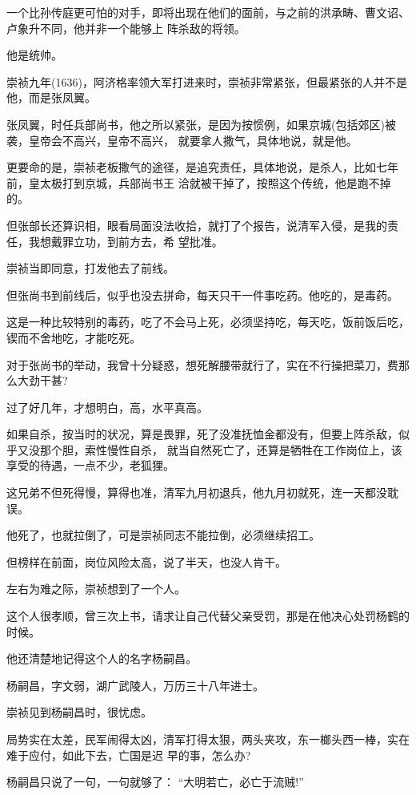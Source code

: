 \documentclass[11pt,a4paper,onecolumn]{article}
\begin{document}
一个比孙传庭更可怕的对手，即将出现在他们的面前，与之前的洪承畴、曹文诏、卢象升不同，他并非一个能够上
阵杀敌的将领。

他是统帅。

崇祯九年(1636)，阿济格率领大军打进来时，崇祯非常紧张，但最紧张的人并不是他，而是张凤翼。

张凤翼，时任兵部尚书，他之所以紧张，是因为按惯例，如果京城(包括郊区)被袭，皇帝会不高兴，皇帝不高兴，
就要拿人撒气，具体地说，就是他。

更要命的是，崇祯老板撒气的途径，是追究责任，具体地说，是杀人，比如七年前，皇太极打到京城，兵部尚书王
洽就被干掉了，按照这个传统，他是跑不掉的。

但张部长还算识相，眼看局面没法收拾，就打了个报告，说清军入侵，是我的责任，我想戴罪立功，到前方去，希
望批准。

崇祯当即同意，打发他去了前线。

但张尚书到前线后，似乎也没去拼命，每天只干一件事\myrule 吃药。他吃的，是毒药。

这是一种比较特别的毒药，吃了不会马上死，必须坚持吃，每天吃，饭前饭后吃，锲而不舍地吃，才能吃死。

对于张尚书的举动，我曾十分疑惑，想死解腰带就行了，实在不行操把菜刀，费那么大劲干甚?

过了好几年，才想明白，高，水平真高。

如果自杀，按当时的状况，算是畏罪，死了没准抚恤金都没有，但要上阵杀敌，似乎又没那个胆，索性慢性自杀，
就当自然死亡了，还算是牺牲在工作岗位上，该享受的待遇，一点不少，老狐狸。

这兄弟不但死得慢，算得也准，清军九月初退兵，他九月初就死，连一天都没耽误。

他死了，也就拉倒了，可是崇祯同志不能拉倒，必须继续招工。

但榜样在前面，岗位风险太高，说了半天，也没人肯干。

左右为难之际，崇祯想到了一个人。

这个人很孝顺，曾三次上书，请求让自己代替父亲受罚，那是在他决心处罚杨鹤的时候。

他还清楚地记得这个人的名字\myrule 杨嗣昌。

杨嗣昌，字文弱，湖广武陵人，万历三十八年进士。

崇祯见到杨嗣昌时，很忧虑。

局势实在太差，民军闹得太凶，清军打得太狠，两头夹攻，东一榔头西一棒，实在难于应付，如此下去，亡国是迟
早的事，怎么办?

杨嗣昌只说了一句，一句就够了： ``大明若亡，必亡于流贼!''

\section[\thesection]{}
\end{document}
